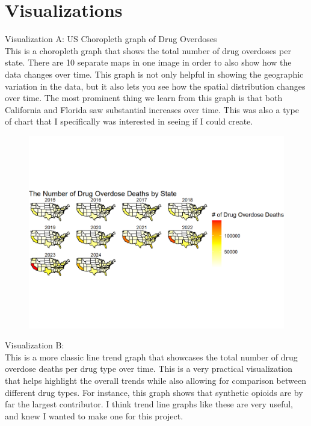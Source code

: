 \documentclass{article}
\begin{document}
\section{Visualizations}
Visualization A: US Choropleth graph of Drug Overdoses
\\This is a choropleth graph that shows the total number of drug overdoses per state. There are 10 separate maps in one image in order to also show how the data changes over time. This graph is not only helpful in showing the geographic variation in the data, but it also lets you see how the spatial distribution changes over time. The most prominent thing we learn from this graph is that both California and Florida saw substantial increases over time. This was also a type of chart that I specifically was interested in seeing if I could create.
\begin{figure}[H]
    \centering
    \includegraphics[width=1\linewidth]{PS6a_Hunt.png}
    \label{fig:enter-label}
    \end{figure}
\noindent Visualization B: 
\\This is a more classic line trend graph that showcases the total number of drug overdose deaths per drug type over time. This is a very practical visualization that helps highlight the overall trends while also allowing for comparison between different drug types. For instance, this graph shows that synthetic opioids are by far the largest contributor. I think trend line graphs like these are very useful, and knew I wanted to make one for this project.
\end{document}
